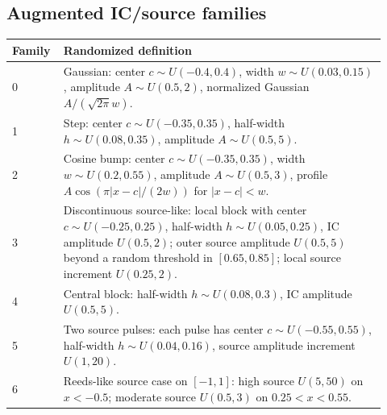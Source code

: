 \documentclass[10pt]{article}
\begin{document}
\subsection*{Augmented IC/source families}
\begin{longtable}{p{0.10\linewidth} p{0.82\linewidth}}
\toprule
Family & Randomized definition \\
\midrule
0 & Gaussian: center \(c\sim U(-0.4,0.4)\), width \(w\sim U(0.03,0.15)\), amplitude \(A\sim U(0.5,2)\), normalized Gaussian \(A/(\sqrt{2\pi}w)\). \\
1 & Step: center \(c\sim U(-0.35,0.35)\), half-width \(h\sim U(0.08,0.35)\), amplitude \(A\sim U(0.5,5)\). \\
2 & Cosine bump: center \(c\sim U(-0.35,0.35)\), width \(w\sim U(0.2,0.55)\), amplitude \(A\sim U(0.5,3)\), profile \(A\cos(\pi |x-c|/(2w))\) for \(|x-c|<w\). \\
3 & Discontinuous source-like: local block with center \(c\sim U(-0.25,0.25)\), half-width \(h\sim U(0.05,0.25)\), IC amplitude \(U(0.5,2)\); outer source amplitude \(U(0.5,5)\) beyond a random threshold in \([0.65,0.85]\); local source increment \(U(0.25,2)\). \\
4 & Central block: half-width \(h\sim U(0.08,0.3)\), IC amplitude \(U(0.5,5)\). \\
5 & Two source pulses: each pulse has center \(c\sim U(-0.55,0.55)\), half-width \(h\sim U(0.04,0.16)\), source amplitude increment \(U(1,20)\). \\
6 & Reeds-like source case on \([-1,1]\): high source \(U(5,50)\) on \(x<-0.5\); moderate source \(U(0.5,3)\) on \(0.25<x<0.55\). \\
\bottomrule
\end{longtable}
\end{document}
